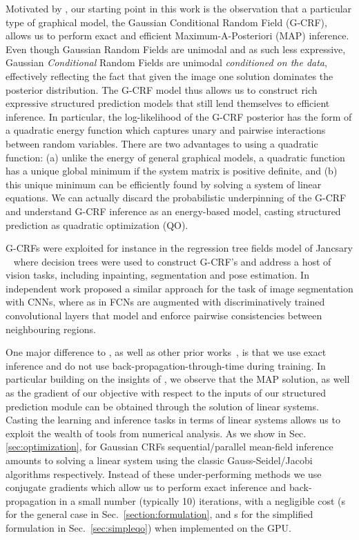 \documentclass[runningheads]{llncs}
\begin{document}
Motivated by \cite{TappenLAF07,rtf}, our starting point in this work is the observation that a particular type of graphical model, the Gaussian Conditional Random Field (G-CRF), 
allows us to perform exact and efficient Maximum-A-Posteriori (MAP) inference. 
Even though Gaussian Random Fields are unimodal and as such less expressive, Gaussian \emph{Conditional} Random Fields are unimodal \emph{conditioned on the data}, effectively
reflecting the fact that given the image one solution dominates the posterior distribution.
The G-CRF model thus allows us to construct rich expressive structured prediction models that still lend
themselves to efficient inference. In particular, the log-likelihood of the G-CRF posterior has the form of a quadratic energy function which captures unary and pairwise interactions between random
variables. There are two advantages to using a quadratic function: (a) unlike the energy of general graphical models, a quadratic  function has a unique global minimum if the system matrix is
positive definite, and (b) this unique minimum can be efficiently found by solving a system of linear equations.
We can actually discard the probabilistic underpinning of the G-CRF and understand G-CRF inference as an energy-based model, casting structured prediction as quadratic optimization (QO). 

G-CRFs were exploited for instance in the regression tree fields model of Jancsary \etal~\cite{rtf}  where decision trees were used to construct G-CRF's and address a host of  vision tasks, including inpainting, segmentation and pose estimation.
In independent work \cite{Vemulapalli_2016_CVPR} proposed a similar approach for the task of image segmentation with CNNs, where 
as  in \cite{Adelaide,DPN,vu2015context} FCNs are augmented with discriminatively trained convolutional layers that model and enforce pairwise consistencies between neighbouring regions.

One major difference to \cite{Vemulapalli_2016_CVPR}, as well as other prior works~\cite{crfrnn,deeplab1,vemulapalli,Adelaide,DPN}, is that
we use exact inference and do not use back-propagation-through-time
during training. In particular building on the insights of \cite{TappenLAF07,rtf}, we observe that the MAP solution, as well as  the gradient of our objective with respect to the inputs of our structured prediction module can be obtained through the solution of linear systems.
Casting the learning and inference tasks in terms of linear systems allows us to exploit the wealth of tools from numerical analysis. As we show in Sec.~ \ref{sec:optimization}, for Gaussian CRFs sequential/parallel mean-field inference amounts to solving a linear system using the classic Gauss-Seidel/Jacobi algorithms respectively. Instead of these under-performing methods we use conjugate gradients which allow us to perform exact inference and back-propagation in a small 
number (typically 10) iterations, with a negligible cost (s for the general case in Sec.~\ref{section:formulation}, and s for the simplified formulation in Sec.~\ref{sec:simpleqo}) when implemented on the GPU. 
\end{document}
